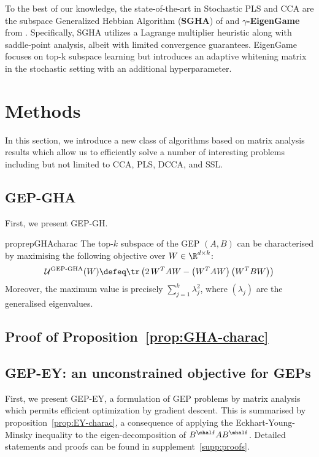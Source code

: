 To the best of our knowledge, the state-of-the-art in Stochastic PLS and CCA are the subspace Generalized Hebbian Algorithm (\textbf{SGHA}) of \citep{chen2019constrained} and \textbf{$\gamma$-EigenGame} from \citep{gemp20,gemp2021}.
Specifically, SGHA utilizes a Lagrange multiplier heuristic along with saddle-point analysis, albeit with limited convergence guarantees.
EigenGame focuses on top-k subspace learning but introduces an adaptive whitening matrix in the stochastic setting with an additional hyperparameter.

\section{Methods}

In this section, we introduce a new class of algorithms based on matrix analysis results which allow us to efficiently solve a number of interesting problems including but not limited to CCA, PLS, DCCA, and SSL.

\subsection{GEP-GHA}
First, we present GEP-GH.

\begin{restatable}{proprep}{GHAcharac}
    \label{prop:GHA-charac}
    The top-$k$ subspace of the GEP $(A,B)$ can be characterised by maximising the following objective over $W \in \R^{d \times k}$:
    \begin{align}
        \mathcal{U}^\text{GEP-GHA}(W) \defeq \tr \left( 2\, W^T A W - \left(W^T A W\right) \left(W^T B W\right) \right)
    \end{align}
    Moreover, the maximum value is precisely $\sum_{j=1}^k \lambda_j^2$, where $(\lambda_j)$ are the generalised eigenvalues.
\end{restatable}

\subsection{Proof of Proposition~\ref{prop:GHA-charac}}

\subsection{GEP-EY: an unconstrained objective for GEPs}

First, we present GEP-EY, a formulation of GEP problems by matrix analysis which permits efficient optimization by gradient descent.
This is summarised by proposition~\ref{prop:EY-charac}, a consequence of applying the Eckhart-Young-Minsky inequality \citep{stewart_matrix_1990} to the eigen-decomposition of $B^\mhalf A B^\mhalf$. Detailed statements and proofs can be found in supplement~\ref{supp:proofs}.

